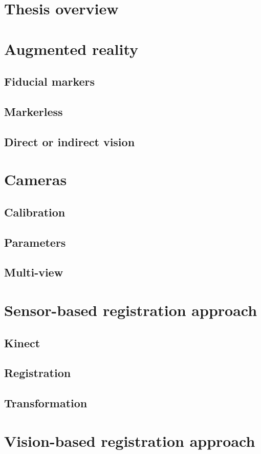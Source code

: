 \documentclass[msc, a4paper, classic, en]{ufbathesis}
\begin{document}
\section{Thesis overview}

\section{Augmented reality}
\subsection{Fiducial markers}
\subsection{Markerless}
\subsection{Direct or indirect vision}
\section{Cameras}
\subsection{Calibration}
\subsection{Parameters}
\subsection{Multi-view}
\section{Sensor-based registration approach}
\subsection{Kinect}
\subsection{Registration}
\subsection{Transformation}
\section{Vision-based registration approach}
\end{document}
